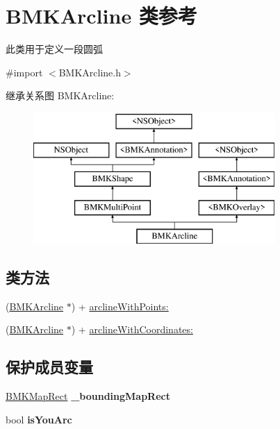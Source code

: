 \hypertarget{interface_b_m_k_arcline}{\section{B\-M\-K\-Arcline 类参考}
\label{interface_b_m_k_arcline}
}


此类用于定义一段圆弧  




{\ttfamily \#import $<$B\-M\-K\-Arcline.\-h$>$}

继承关系图 B\-M\-K\-Arcline\-:\begin{figure}[H]
\begin{center}
\leavevmode
\includegraphics[height=5.000000cm]{interface_b_m_k_arcline}
\end{center}
\end{figure}
\subsection*{类方法}
\begin{DoxyCompactItemize}
\item 
(\hyperlink{interface_b_m_k_arcline}{B\-M\-K\-Arcline} $\ast$) + \hyperlink{interface_b_m_k_arcline_ad439d6682d48b51c0b04e84772a38a79}{arcline\-With\-Points\-:}
\item 
(\hyperlink{interface_b_m_k_arcline}{B\-M\-K\-Arcline} $\ast$) + \hyperlink{interface_b_m_k_arcline_a34a5daa9fc480861aa52e2ef5b0ccb3a}{arcline\-With\-Coordinates\-:}
\end{DoxyCompactItemize}
\subsection*{保护成员变量}
\begin{DoxyCompactItemize}
\item 
\hypertarget{interface_b_m_k_arcline_abbb8f0dba8c81ab8bcd8cc8e587d51cf}{\hyperlink{struct_b_m_k_map_rect}{B\-M\-K\-Map\-Rect} {\bfseries \-\_\-bounding\-Map\-Rect}}\label{interface_b_m_k_arcline_abbb8f0dba8c81ab8bcd8cc8e587d51cf}

\item 
\hypertarget{interface_b_m_k_arcline_ae74be329c0bfedce99b890f70d3b871e}{bool {\bfseries is\-You\-Arc}}\label{interface_b_m_k_arcline_ae74be329c0bfedce99b890f70d3b871e}

\end{DoxyCompactItemize}

